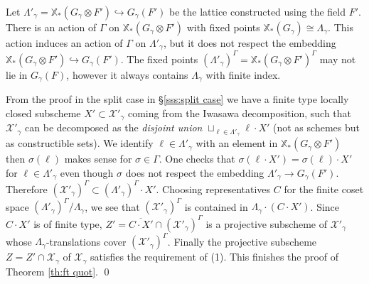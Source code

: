 \documentclass[]{pcmi}
\theoremstyle{plain}
\theoremstyle{definition}
\newcommand{\sX}{\ensuremath{\mathscr{X}}\xspace}
\newcommand{\sX}{\ensuremath{\mathcal{X}}\xspace}
\newcommand\xcoch{\mathbb{X}_*}
\newcommand{\incl}{\hookrightarrow}
\renewcommand{\L}{\Lambda}
\newcommand\ov{\overline}
\begin{document}
Let $\L'_{\gamma}=\xcoch(G_{\gamma}\otimes F')\incl G_{\gamma}(F')$ be the lattice constructed using the field $F'$. There is an action of $\Gamma$ on $\xcoch(G_{\gamma}\otimes F')$ with fixed points $\xcoch(G_{\gamma})\cong \L_{\gamma}$. This action induces an action of $\Gamma$ on $\L'_{\gamma}$, but it does not respect the embedding $\xcoch(G_{\gamma}\otimes F')\incl G_{\gamma}(F')$. The fixed points $(\L'_{\gamma})^{\Gamma}=\xcoch(G_{\gamma}\otimes F')^{\Gamma}$ may not lie in $G_{\gamma}(F)$, however it always contains $\L_{\gamma}$ with finite index. 

From the proof in the split case in \S\ref{sss:split case} we have a finite type locally closed subscheme $X'\subset\sX'_{\gamma}$ coming from the Iwasawa decomposition, such that $\sX'_{\gamma}$ can be decomposed as the {\em disjoint union} $\sqcup_{\ell\in\L'_{\gamma}}\ell\cdot X'$  (not as schemes but as constructible sets). We identify $\ell\in \L'_{\gamma}$ with an element in $\xcoch(G_{\gamma}\otimes F')$ then $\sigma(\ell)$ makes sense for $\sigma\in\Gamma$. One checks that $\sigma(\ell\cdot X')=\sigma(\ell)\cdot X'$ for $\ell\in\L'_{\gamma}$ even though $\sigma$ does not respect the embedding $\L'_{\gamma}\to G_{\gamma}(F')$. Therefore $(\sX'_{\gamma})^{\Gamma}\subset (\L'_{\gamma})^{\Gamma}\cdot X'$. Choosing representatives $C$ for the finite coset space $(\L'_{\gamma})^{\Gamma}/\L_{\gamma}$, we see that $(\sX'_{\gamma})^{\Gamma}$ is contained in $\L_{\gamma}\cdot (C\cdot X')$. Since $C\cdot X'$ is of finite type, $Z'=\ov{C\cdot X'}\cap (\sX'_{\gamma})^{\Gamma}$ is a projective subscheme of $\sX'_{\gamma}$ whose $\L_{\gamma}$-translations cover $(\sX'_{\gamma})^{\Gamma}$. Finally the projective subscheme $Z=Z'\cap \sX_{\gamma}$ of $\sX_{\gamma}$ satisfies the requirement of (1).  This finishes the proof of Theorem \ref{th:ft quot}. \qed
\end{document}
